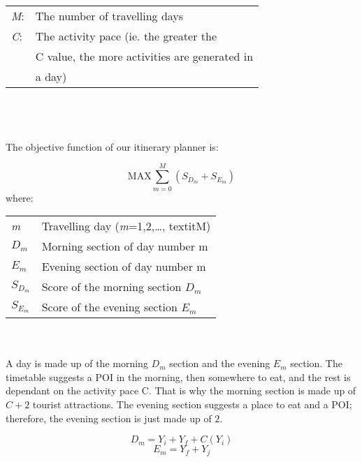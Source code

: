 

\setlength{\tabcolsep}{20pt}

\begin{tabular}{l l}

\textit{M}:  &  The number of travelling days \\
\textit{C}: & The activity pace (ie. the greater the \\
 & C value, the more activities are generated in \\
 & a day) \\  
\end{tabular}
\\
\\
\\
The objective function of our itinerary planner is:

\[ \text{MAX}  \sum_{m=0}^{M} ( S_{{D_m}} + S_{{E_m}}) \]
where:
\\
\begin{tabular}{l l}
\textit{m} & Travelling day (\textit{m}=1,2,\ldots, textit{M}) \\ 
\textit{$D_m$} & Morning section of day number m \\  
\textit{$E_m$} & Evening section of day number m \\  
\textit{$S_{D_m}$} & Score of the morning section $D_m$ \\  
\textit{$S_{E_m}$} & Score of the evening section $E_m$ \\  
\end{tabular}
\\
\\

A day is made up of the morning ${D_m}$ section and
the evening ${E_m}$ section. The timetable suggests a
POI in the morning, then somewhere to eat, and the
rest is dependant on the activity pace C. That is why
the morning section is made up of $C + 2$ tourist
attractions. The evening section suggests a place to
eat and a POI; therefore, the evening section is just
made up of $2$. 


\[D_m = Y_i + Y_f + C ( Y_i) \]
\[E_m = Y_f + Y_j \]

